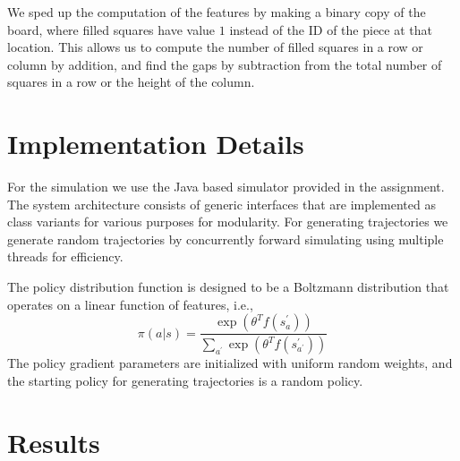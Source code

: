 \documentclass[11pt]{article}
\begin{document}
We sped up the computation of the features by making a binary copy of the board, where filled squares have value $1$ instead of the ID of the piece at that location.  This allows us to compute the number of filled squares in a row or column by addition, and find the gaps by subtraction from the total number of squares in a row or the height of the column.


\section{Implementation Details}
For the simulation we use the Java based simulator provided in the assignment. The system architecture consists of generic interfaces that are implemented as class variants for various purposes for modularity. For generating trajectories we generate random trajectories by concurrently forward simulating using multiple threads for efficiency.

The policy distribution function is designed to be a Boltzmann distribution that operates on a linear function of features, i.e.,
\[ \pi(a|s)=\frac{\exp\left(\theta^{T}f\left(s_{a}^{\prime}\right)\right)}{\underset{a^{\prime}}{\sum}\exp\left(\theta^{T}f\left(s_{a^{\prime}}^{\prime}\right)\right)} \]
 The policy gradient parameters are initialized with uniform random weights, and the starting policy for generating trajectories is a random policy.


\section{Results}
\end{document}
